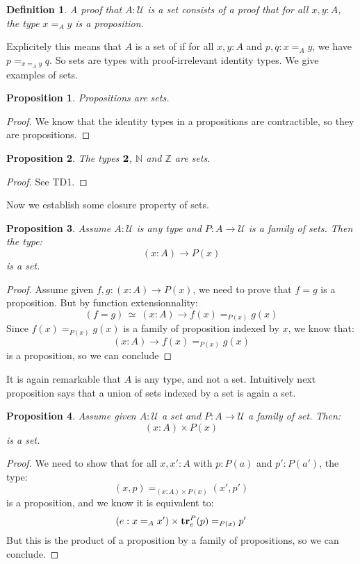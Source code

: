 \documentclass{article}
\newcommand{\U}{{\mathcal U}}
\renewcommand{\r}{\rightarrow}
\newcommand{\tr}{\mathrm{\bf tr}}
\newcommand{\two}{{\bf 2}}
\newtheorem{definition}{Definition}
\newtheorem{proposition}{Proposition}
\begin{document}
\begin{definition}
A proof that $A:\U$ is a set consists of a proof that for all $x,y:A$, the type $x=_A y$ is a proposition.
\end{definition}

Explicitely this means that $A$ is a set of if for all $x,y:A$ and $p,q:x=_Ay$, we have $p=_{x=_Ay} q$. So sets are types with proof-irrelevant identity types. We give examples of sets.

\begin{proposition}
Propositions are sets.
\end{proposition}
\begin{proof}
We know that the identity types in a propositions are contractible, so they are propositions.
\end{proof}

\begin{proposition}
The types $\two$, $\mathbb{N}$ and $\mathbb{Z}$ are sets.
\end{proposition}
\begin{proof}
See TD1.
\end{proof}

Now we establish some closure property of sets.

\begin{proposition}
Assume $A:\U$ is any type and $P:A\r \U$ is a family of sets. Then the type:
\[(x:A)\r P(x)\]
is a set.
\end{proposition}
\begin{proof}
Assume given $f,g:(x:A)\r P(x)$, we need to prove that $f=g$ is a proposition. But by function extensionnality:
\[(f=g)\, \simeq \ (x:A)\r f(x)=_{P(x)}g(x)\]
Since $f(x)=_{P(x)}g(x)$ is a family of proposition indexed by $x$, we know that:
\[(x:A)\r f(x)=_{P(x)}g(x)\]
is a proposition, so we can conclude
\end{proof}

It is again remarkable that $A$ is any type, and not a set. Intuitively next proposition says that a union of sets indexed by a set is again a set.

\begin{proposition}
Assume given $A:\U$ a set and $P:A\r \U$ a family of set. Then:
\[(x:A)\times P(x)\]
is a set.
\end{proposition}
\begin{proof}
We need to show that for all $x,x':A$ with $p:P(a)$ and $p':P(a')$, the type:
\[(x,p)=_{(x:A)\times P(x)}(x',p')\]
is a proposition, and we know it is equivalent to:
\[(e:x=_Ax')\times \tr^P_e(p) =_{P(x)} p'\]
But this is the product of a proposition by a family of propositions, so we can conclude.
\end{proof}
\end{document}

